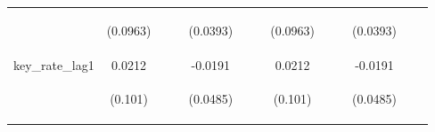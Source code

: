 \documentclass[]{article}
\begin{document}
\begin{center}
\begin{tabular}{lcccccccccccc}
\vspace{4pt} & \begin{footnotesize}(0.0963)\end{footnotesize} & \begin{footnotesize}\end{footnotesize} & \begin{footnotesize}\end{footnotesize} & \begin{footnotesize}(0.0393)\end{footnotesize} & \begin{footnotesize}\end{footnotesize} & \begin{footnotesize}\end{footnotesize} & \begin{footnotesize}(0.0963)\end{footnotesize} & \begin{footnotesize}\end{footnotesize} & \begin{footnotesize}\end{footnotesize} & \begin{footnotesize}(0.0393)\end{footnotesize} & \begin{footnotesize}\end{footnotesize} & \begin{footnotesize}\end{footnotesize} \\
key\_rate\_lag1 & 0.0212 &  &  & -0.0191 &  &  & 0.0212 &  &  & -0.0191 &  &  \\
\vspace{4pt} & \begin{footnotesize}(0.101)\end{footnotesize} & \begin{footnotesize}\end{footnotesize} & \begin{footnotesize}\end{footnotesize} & \begin{footnotesize}(0.0485)\end{footnotesize} & \begin{footnotesize}\end{footnotesize} & \begin{footnotesize}\end{footnotesize} & \begin{footnotesize}(0.101)\end{footnotesize} & \begin{footnotesize}\end{footnotesize} & \begin{footnotesize}\end{footnotesize} & \begin{footnotesize}(0.0485)\end{footnotesize} & \begin{footnotesize}\end{footnotesize} & \begin{footnotesize}\end{footnotesize} \\

\end{tabular}
\end{center}
\end{document}
